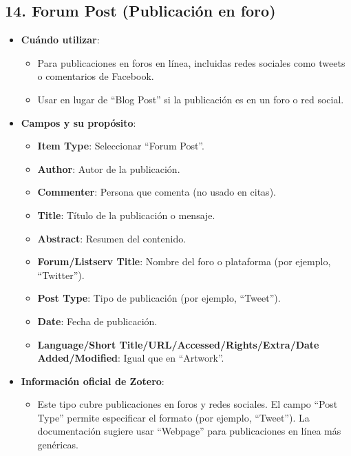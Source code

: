 \documentclass[
  jou,
  floatsintext,
  longtable,
  a4paper,
  nolmodern,
  notxfonts,
  notimes,
  colorlinks=true,linkcolor=blue,citecolor=blue,urlcolor=blue]{apa7}
\providecommand{\tightlist}{%
  \setlength{\itemsep}{0pt}\setlength{\parskip}{0pt}}
\begin{document}
\subsection{14. Forum Post (Publicación en
foro)}\label{forum-post-publicaciuxf3n-en-foro}

\begin{itemize}
\tightlist
\item
  \textbf{Cuándo utilizar}:

  \begin{itemize}
  \tightlist
  \item
    Para publicaciones en foros en línea, incluidas redes sociales como
    tweets o comentarios de Facebook.
  \item
    Usar en lugar de ``Blog Post'' si la publicación es en un foro o red
    social.
  \end{itemize}
\item
  \textbf{Campos y su propósito}:

  \begin{itemize}
  \tightlist
  \item
    \textbf{Item Type}: Seleccionar ``Forum Post''.
  \item
    \textbf{Author}: Autor de la publicación.
  \item
    \textbf{Commenter}: Persona que comenta (no usado en citas).
  \item
    \textbf{Title}: Título de la publicación o mensaje.
  \item
    \textbf{Abstract}: Resumen del contenido.
  \item
    \textbf{Forum/Listserv Title}: Nombre del foro o plataforma (por
    ejemplo, ``Twitter'').
  \item
    \textbf{Post Type}: Tipo de publicación (por ejemplo, ``Tweet'').
  \item
    \textbf{Date}: Fecha de publicación.
  \item
    \textbf{Language/Short Title/URL/Accessed/Rights/Extra/Date
    Added/Modified}: Igual que en ``Artwork''.
  \end{itemize}
\item
  \textbf{Información oficial de Zotero}:

  \begin{itemize}
  \tightlist
  \item
    Este tipo cubre publicaciones en foros y redes sociales. El campo
    ``Post Type'' permite especificar el formato (por ejemplo,
    ``Tweet''). La documentación sugiere usar ``Webpage'' para
    publicaciones en línea más genéricas.
  \end{itemize}
\end{itemize}
\end{document}
